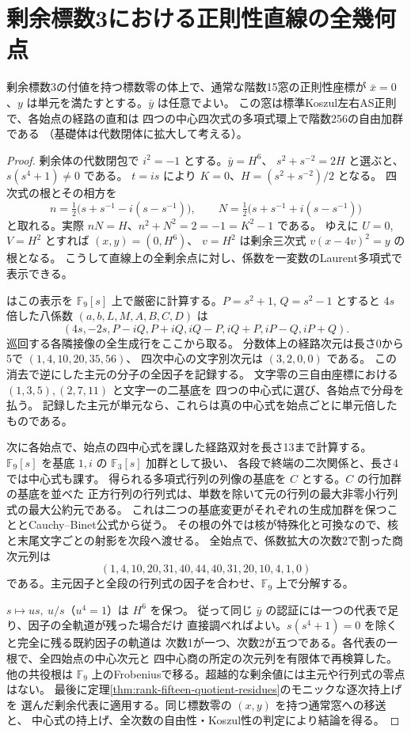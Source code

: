 \section{剰余標数3における正則性直線の全幾何点}
\label{sec:rank-fifteen-residue-line}
\begin{theorem}\label{thm:rank-fifteen-residue-line}
剰余標数3の付値を持つ標数零の体上で、通常な階数15窓の正則性座標が
$\bar x=0$、$y$ は単元を満たすとする。$\bar y$ は任意でよい。
この窓は標準Koszul左右AS正則で、各始点の経路の直和は
四つの中心四次式の多項式環上で階数256の自由加群である
（基礎体は代数閉体に拡大して考える）。
\end{theorem}
\begin{proof}
剰余体の代数閉包で $i^2=-1$ とする。$\bar y=H^6$、
$s^2+s^{-2}=2H$ と選ぶと、$s(s^4+1)\ne0$ である。
$t=is$ により $K=0$、$H=(s^2+s^{-2})/2$ となる。
四次式の根とその相方を
\[
 n=\tfrac12\bigl(s+s^{-1}-i(s-s^{-1})\bigr),\qquad
 N=\tfrac12\bigl(s+s^{-1}+i(s-s^{-1})\bigr)
\]
と取れる。実際 $nN=H$、$n^2+N^2=2=-1=K^2-1$ である。
ゆえに $U=0$, $V=H^2$ とすれば $(x,y)=(0,H^6)$、
$v=H^2$ は剰余三次式 $v(x-4v)^2=y$ の根となる。
こうして直線上の全剰余点に対し、係数を一変数のLaurent多項式で表示できる。

 はこの表示を
$\mathbb F_9[s]$ 上で厳密に計算する。$P=s^2+1$, $Q=s^2-1$ とすると
$4s$ 倍した八係数 $(a,b,L,M,A,B,C,D)$ は
\[
 (4s,-2s,P-iQ,P+iQ,iQ-P,iQ+P,iP-Q,iP+Q).
\]
巡回する各隣接像の全生成行をここから取る。
分数体上の経路次元は長さ0から5で $(1,4,10,20,35,56)$、
四次中心の文字別次元は $(3,2,0,0)$ である。
この消去で逆にした主元の分子の全因子を記録する。
文字零の三自由座標における $(1,3,5),(2,7,11)$ と文字一の二基底を
四つの中心式に選び、各始点で分母を払う。
記録した主元が単元なら、これらは真の中心式を始点ごとに単元倍したものである。

次に各始点で、始点の四中心式を課した経路双対を長さ13まで計算する。
$\mathbb F_9[s]$ を基底 $1,i$ の $\mathbb F_3[s]$ 加群として扱い、
各段で終端の二次関係と、長さ4では中心式も課す。
得られる多項式行列の列像の基底を $C$ とする。$C$ の行加群の基底を並べた
正方行列の行列式は、単数を除いて元の行列の最大非零小行列式の最大公約元である。
これは二つの基底変更がそれぞれの生成加群を保つこととCauchy--Binet公式から従う。
その根の外では核が特殊化と可換なので、核と末尾文字ごとの射影を次段へ渡せる。
全始点で、係数拡大の次数2で割った商次元列は
\[
 (1,4,10,20,31,40,44,40,31,20,10,4,1,0)
\]
である。主元因子と全段の行列式の因子を合わせ、$\mathbb F_9$ 上で分解する。

$s\mapsto us,\ u/s$（$u^4=1$）は $H^6$ を保つ。
従って同じ $\bar y$ の認証には一つの代表で足り、因子の全軌道が残った場合だけ
直接調べればよい。$s(s^4+1)=0$ を除くと完全に残る既約因子の軌道は
次数1が一つ、次数2が五つである。各代表の一根で、全四始点の中心次元と
四中心商の所定の次元列を有限体で再検算した。他の共役根は
$\mathbb F_9$ 上のFrobeniusで移る。超越的な剰余値には主元や行列式の零点はない。
最後に定理\ref{thm:rank-fifteen-quotient-residues}のモニックな逐次持上げを
選んだ剰余代表に適用する。同じ標数零の $(x,y)$ を持つ通常窓への移送と、
中心式の持上げ、全次数の自由性・Koszul性の判定により結論を得る。
\end{proof}
